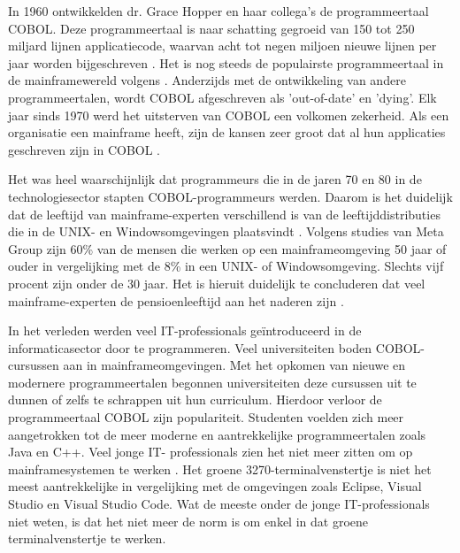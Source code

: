 In 1960 ontwikkelden dr. Grace Hopper en haar collega's de programmeertaal COBOL. Deze programmeertaal is naar schatting gegroeid van 150 tot 250 miljard lijnen applicatiecode, waarvan acht tot negen miljoen nieuwe lijnen per jaar worden bijgeschreven \autocite{Waites2013}. Het is nog steeds de populairste programmeertaal in de mainframewereld volgens \textcite{Waites2013}. Anderzijds met de ontwikkeling van andere programmeertalen, wordt COBOL afgeschreven als 'out-of-date' en 'dying'. Elk jaar sinds 1970 werd het uitsterven van COBOL een volkomen zekerheid. Als een organisatie een mainframe heeft, zijn de kansen zeer groot dat al hun applicaties geschreven zijn in COBOL \autocite{Waites2013}. 

Het was heel waarschijnlijk dat programmeurs die in de jaren 70 en 80 in de technologiesector stapten COBOL-programmeurs werden. Daarom is het duidelijk dat de leeftijd van mainframe-experten verschillend is van de leeftijddistributies die in de UNIX- en Windowsomgevingen plaatsvindt \autocite{McGirr2004}. Volgens studies van Meta Group zijn 60\% van de mensen die werken op een mainframeomgeving  50 jaar of ouder in vergelijking met de 8\% in een UNIX- of Windowsomgeving. Slechts vijf procent zijn onder de 30 jaar. Het is hieruit duidelijk te concluderen dat veel mainframe-experten de pensioenleeftijd aan het naderen zijn \autocite{McGirr2004}. 

In het verleden werden veel IT-professionals geïntroduceerd in de informaticasector door te programmeren. Veel universiteiten boden COBOL-cursussen aan in mainframeomgevingen. Met het opkomen van nieuwe en modernere programmeertalen begonnen universiteiten deze cursussen uit te dunnen of zelfs te schrappen uit hun curriculum. Hierdoor verloor de programmeertaal COBOL zijn populariteit. Studenten voelden zich meer aangetrokken tot de meer moderne en aantrekkelijke programmeertalen zoals Java en C++. Veel jonge IT- professionals zien het niet meer zitten om op mainframesystemen te werken \autocite{Mullins2016}. Het groene 3270-terminalvenstertje is niet het meest aantrekkelijke in vergelijking met de omgevingen zoals Eclipse, Visual Studio en Visual Studio Code. Wat de meeste onder de jonge IT-professionals niet weten, is dat het niet meer de norm is om enkel in dat groene terminalvenstertje te werken. 

